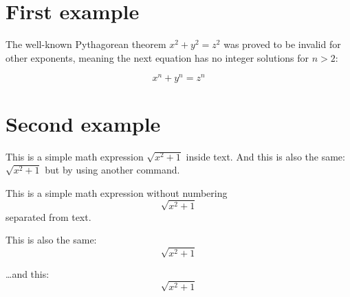 \documentclass{article}
\begin{document}
\section{First example}

The well-known Pythagorean theorem \(x^2 + y^2 = z^2\) was proved to be invalid for other exponents, meaning the next equation has no integer solutions for \(n>2\):

\[ x^n + y^n = z^n \]

\section{Second example}

This is a simple math expression \(\sqrt{x^2+1}\) inside text. 
And this is also the same: 
\begin{math}
\sqrt{x^2+1}
\end{math}
but by using another command.

This is a simple math expression without numbering
\[\sqrt{x^2+1}\] 
separated from text.

This is also the same:
\begin{displaymath}
\sqrt{x^2+1}
\end{displaymath}

\ldots and this:
\begin{equation*}
\sqrt{x^2+1}
\end{equation*}
\end{document}
